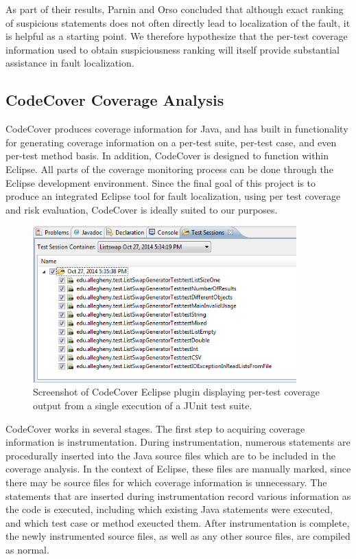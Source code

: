 \documentclass[11pt]{article}
\begin{document}
As part of their results, Parnin and Orso concluded that
although exact ranking of suspicious statements does not often directly
lead to localization of the fault, it is helpful as a starting point.
We therefore hypothesize that the per-test coverage information used to
obtain suspiciousness ranking will itself provide substantial assistance
in fault localization.

\subsection{CodeCover Coverage Analysis}
CodeCover produces coverage information for Java, and has built in 
functionality for generating coverage information on a per-test suite,
per-test case, and even per-test method basis.  In addition, CodeCover
is designed to function within Eclipse.  All parts of the coverage
monitoring process can be done through the Eclipse development
environment.  Since the final goal of this project is to produce an
integrated Eclipse tool for fault localization, using per test
coverage and risk evaluation, CodeCover is ideally suited to our
purposes.  

\begin{figure}[htpb]
  \centering
  \includegraphics[width=4in]{img/codecoverpertest.png}
  \caption{Screenshot of CodeCover Eclipse plugin displaying per-test coverage
  output from a single execution of a JUnit test suite.}
  \label{codecover}
\end{figure}

CodeCover works in several stages.  The first step to acquiring coverage
information is instrumentation.  During instrumentation, numerous
statements are procedurally inserted into the Java source files which 
are to be included in the coverage analysis.  In the context of Eclipse,
these files are manually marked, since there may be source files for 
which coverage information is unnecessary.  The statements that are 
inserted during instrumentation record various information as the code
is executed, including which existing Java statements were executed, and
which test case or method exeucted them.  After instrumentation is
complete, the newly instrumented source files, as well as any other source
files, are compiled as normal.
\end{document}

